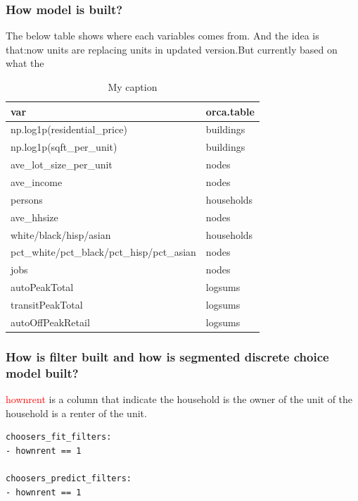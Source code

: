 \documentclass{article}\usepackage[]{graphicx}\usepackage[]{color}
\newcommand{\red}[1]{\textcolor{red}{#1}}
\newcommand{\red}[1]{\textcolor{red}{#1}}
\begin{document}
\subsubsection{How model is built?}

The below table shows where each variables comes from. And the idea is that:now units are replacing units in updated version.But currently based on what the \\

\begin{table}[]
\centering
\caption{My caption}
\label{my-label}
\begin{tabular}{|l|l|}
\hline
\textbf{var}                               & \textbf{orca.table} \\ \hline
np.log1p(residential\_price)               & buildings           \\ \hline
np.log1p(sqft\_per\_unit)                  & buildings           \\ \hline
ave\_lot\_size\_per\_unit                  & nodes               \\ \hline
ave\_income                                & nodes               \\ \hline
persons                                    & households          \\ \hline
ave\_hhsize                                & nodes               \\ \hline
white/black/hisp/asian                     & households          \\ \hline
pct\_white/pct\_black/pct\_hisp/pct\_asian & nodes               \\ \hline
jobs                                       & nodes               \\ \hline
autoPeakTotal                              & logsums             \\ \hline
transitPeakTotal                           & logsums             \\ \hline
autoOffPeakRetail                          & logsums             \\ \hline
\end{tabular}
\end{table}


\subsubsection{How is filter built and how is segmented discrete choice model built?}

\red{hownrent} is a column that indicate the household is the owner of the unit of the household is a renter of the unit.\\
\begin{lstlisting}
choosers_fit_filters:
- hownrent == 1

choosers_predict_filters:
- hownrent == 1
\end{lstlisting}
\end{document}
